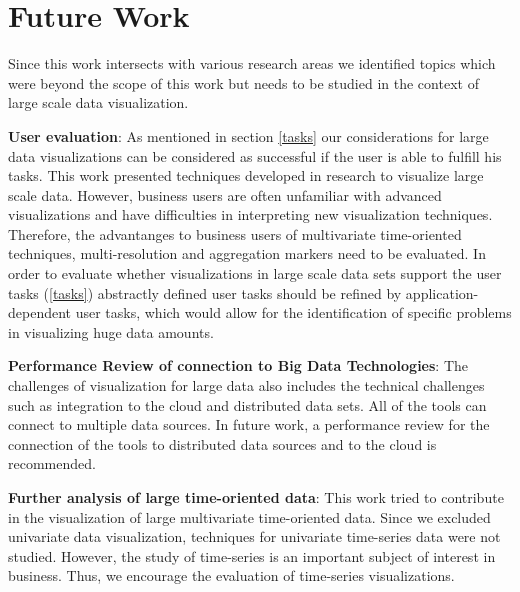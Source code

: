 \section{Future Work}
Since this work intersects with various research areas we identified topics which were beyond the scope of this work but needs to be studied in the context of large scale data visualization.
\par
\textbf{User evaluation}: 
As mentioned in section \ref{tasks} our considerations for large data visualizations can be considered as successful if the user is able to fulfill his tasks. This work presented techniques developed in research to visualize large scale data. However, business users are often unfamiliar with advanced visualizations and have difficulties in interpreting new visualization techniques. Therefore, the advantanges to business users of multivariate time-oriented techniques, multi-resolution and aggregation markers need to be evaluated. In order to evaluate whether visualizations in large scale data sets support the user tasks (\ref{tasks}) abstractly defined user tasks should be refined by application-dependent user tasks, which would allow for the identification of specific problems in visualizing huge data amounts.
\par
\textbf{Performance Review of connection to Big Data Technologies}: 
The challenges of visualization for large data also includes the technical challenges such as integration to the cloud and distributed data sets. All of the tools can connect to multiple data sources. In future work, a performance review for the connection of the tools to distributed data sources and to the cloud is recommended. 
\par
\textbf{Further analysis of large time-oriented data}: 
This work tried to contribute in the visualization of large multivariate time-oriented data. Since we excluded univariate data visualization, techniques for univariate time-series data were not studied. However, the study of time-series is an important subject of interest in business. Thus, we encourage the evaluation of time-series visualizations.\\

